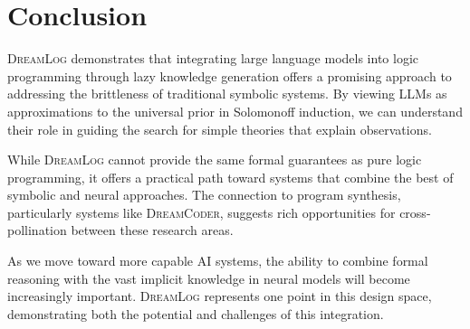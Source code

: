 \documentclass[11pt,a4paper]{article}
\newcommand{\dreamlog}{\textsc{DreamLog}}
\newcommand{\dreamcoder}{\textsc{DreamCoder}}
\begin{document}
\section{Conclusion}

\dreamlog{} demonstrates that integrating large language models into logic programming through lazy knowledge generation offers a promising approach to addressing the brittleness of traditional symbolic systems. By viewing LLMs as approximations to the universal prior in Solomonoff induction, we can understand their role in guiding the search for simple theories that explain observations.

While \dreamlog{} cannot provide the same formal guarantees as pure logic programming, it offers a practical path toward systems that combine the best of symbolic and neural approaches. The connection to program synthesis, particularly systems like \dreamcoder{}, suggests rich opportunities for cross-pollination between these research areas.

As we move toward more capable AI systems, the ability to combine formal reasoning with the vast implicit knowledge in neural models will become increasingly important. \dreamlog{} represents one point in this design space, demonstrating both the potential and challenges of this integration.



\end{document}

